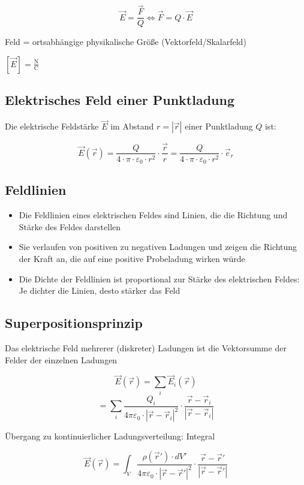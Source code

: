 \documentclass[
  11pt,
]{article}
\providecommand{\tightlist}{%
  \setlength{\itemsep}{0pt}\setlength{\parskip}{0pt}}
\begin{document}
\[\vec{E} = \frac{\vec{F}}{Q} \Leftrightarrow \vec{F} = Q \cdot \vec{E}\]

Feld = ortsabhängige physikalische Größe (Vektorfeld/Skalarfeld)

\([\vec{E}] = \frac{\text{N}}{\text{C}}\)

\subsection{Elektrisches Feld einer
Punktladung}\label{elektrisches-feld-einer-punktladung}

Die elektrische Feldstärke \(\vec{E}\) im Abstand \(r=|\vec{r}|\) einer
Punktladung \(Q\) ist:

\[\vec{E}(\vec r) = \frac{Q}{4 \cdot \pi \cdot \varepsilon_0 \cdot r^2} \cdot \frac{\vec{r}}{r} = \frac{Q}{4 \cdot \pi \cdot \varepsilon_0 \cdot r^2} \cdot \vec{e}_r\]

\subsection{Feldlinien}\label{feldlinien}

\begin{itemize}
\tightlist
\item
  Die Feldlinien eines elektrischen Feldes sind Linien, die die Richtung
  und Stärke des Feldes darstellen
\item
  Sie verlaufen von positiven zu negativen Ladungen und zeigen die
  Richtung der Kraft an, die auf eine positive Probeladung wirken würde
\item
  Die Dichte der Feldlinien ist proportional zur Stärke des elektrischen
  Feldes: Je dichter die Linien, desto stärker das Feld
\end{itemize}

\subsection{Superpositionsprinzip}\label{superpositionsprinzip}

Das elektrische Feld mehrerer (diskreter) Ladungen ist die Vektorsumme
der Felder der einzelnen Ladungen

\[\vec{E}(\vec{r}) = \sum_{i} \vec{E}_i(\vec{r})\]
\[= \sum_{i} \frac{Q_i}{4 \pi \varepsilon_0 \cdot |\vec{r}-\vec{r}_i|^2} \cdot \frac{\vec{r}-\vec{r}_i}{|\vec{r}-\vec{r}_i|}\]

Übergang zu kontinuierlicher Ladungsverteilung: Integral

\[\vec{E}(\vec{r}) = \int_{V} \frac{\rho(\vec{r}') \cdot dV'}{4 \pi \varepsilon_0 \cdot |\vec{r}-\vec{r}'|^2} \cdot \frac{\vec{r}-\vec{r}'}{|\vec{r}-\vec{r}'|}\]
\end{document}
